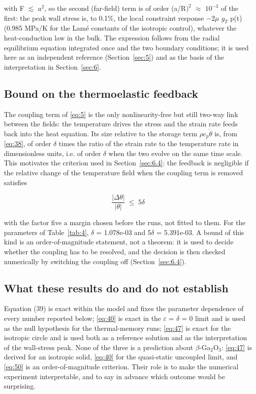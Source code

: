 \documentclass[preprint,12pt]{elsarticle}
\begin{document}
with F $\lesssim$ $a^{2}$, so the second (far-field) term is of order (a/R$)^{2}$ $\approx$ $10^{-3}$ of the first: the peak wall stress is, to 0.1\%, the local constraint response $-$2$\mu$ $g_{T}$ p(t) (0.985 MPa/K for the Lam\'e constants of the isotropic control), whatever the heat-conduction law in the bulk. The expression follows from the radial equilibrium equation integrated once and the two boundary conditions; it is used here as an independent reference (Section~\ref{sec:5}) and as the basis of the interpretation in Section~\ref{sec:6}.

\subsection{Bound on the thermoelastic feedback}
\label{sec:3.4}

The coupling term of \eqref{eq:5} is the only nonlinearity-free but still two-way link between the fields: the temperature drives the stress and the strain rate feeds back into the heat equation. Its size relative to the storage term $\rho c_{p}\dot{\theta}$ is, from \eqref{eq:38}, of order $\delta$ times the ratio of the strain rate to the temperature rate in dimensionless units, i.e. of order $\delta$ when the two evolve on the same time scale. This motivates the criterion used in Section~\ref{sec:6.4}: the feedback is negligible if the relative change of the temperature field when the coupling term is removed satisfies

\begin{equation}
\frac{|\Delta\theta|}{|\theta|}\;\leq\;5\delta 
\label{eq:50}
\end{equation}

with the factor five a margin chosen before the runs, not fitted to them. For the parameters of Table~\ref{tab:4}, $\delta$ = 1.078e-03 and 5$\delta$ = 5.391e-03. A bound of this kind is an order-of-magnitude statement, not a theorem: it is used to decide whether the coupling has to be resolved, and the decision is then checked numerically by switching the coupling off (Section~\ref{sec:6.4}).

\subsection{What these results do and do not establish}
\label{sec:3.5}

Equation (39) is exact within the model and fixes the parameter dependence of every number reported below; \eqref{eq:40} is exact in the $\varepsilon$ = $\delta$ = 0 limit and is used as the null hypothesis for the thermal-memory runs; \eqref{eq:47} is exact for the isotropic circle and is used both as a reference solution and as the interpretation of the wall-stress peak. None of the three is a prediction about $\beta$-Ga$_2$O$_3$: \eqref{eq:47} is derived for an isotropic solid, \eqref{eq:40} for the quasi-static uncoupled limit, and \eqref{eq:50} is an order-of-magnitude criterion. Their role is to make the numerical experiment interpretable, and to say in advance which outcome would be surprising.
\end{document}
